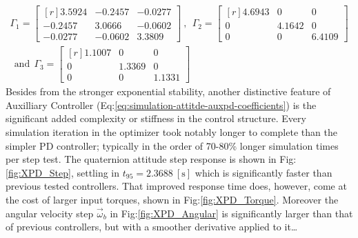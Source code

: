\begin{multline}\label{eq:optimized-auxpd}
\Gamma_1=\begin{bmatrix*}[r]
3.5924 & -0.2457 & -0.0277\\
-0.2457 & 3.0666 & -0.0602\\
-0.0277 & -0.0602 & 3.3809
\end{bmatrix*}~,~~\Gamma_2=\begin{bmatrix*}[r]
4.6943 & 0 & 0\\
0 & 4.1642 & 0\\
0 & 0 & 6.4109
\end{bmatrix*}\\
~~\text{and}~~\Gamma_3=\begin{bmatrix*}[r]
1.1007 & 0 & 0\\
0 & 1.3369 & 0 \\
0 & 0 & 1.1331
\end{bmatrix*}
\end{multline}
Besides from the stronger exponential stability, another distinctive feature of Auxilliary Controller (Eq:\ref{eq:simulation-attitde-auxpd-coefficients}) is the significant added complexity or stiffness in the control structure. Every simulation iteration in the optimizer took notably longer to complete than the simpler PD controller; typically in the order of 70-80\% longer simulation times per step test. The quaternion attitude step response is shown in Fig:\ref{fig:XPD_Step}, settling in $t_{95}=2.3688~[\text{s}]$ which is significantly faster than previous tested controllers. That improved response time does, however, come at the cost of larger input torques, shown in Fig:\ref{fig:XPD_Torque}. Moreover the angular velocity step $\vec{\omega}_b$ in Fig:\ref{fig:XPD_Angular} is significantly larger than that of previous controllers, but with a smoother derivative applied to it\ldots
\par
